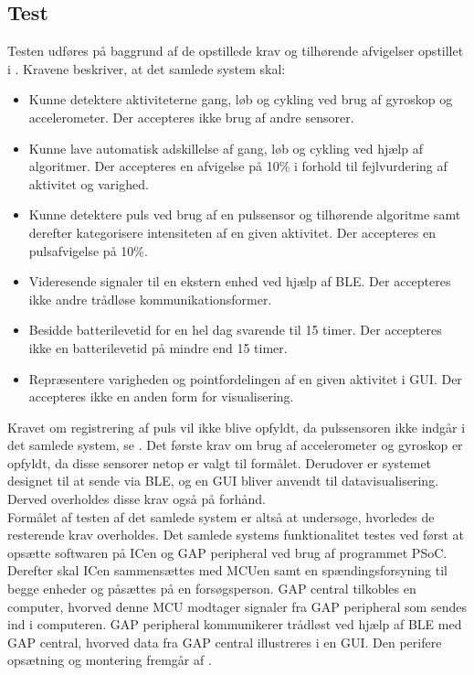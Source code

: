 \subsection{Test}
Testen udføres på baggrund af de opstillede krav og tilhørende afvigelser opstillet i . Kravene beskriver, at det samlede system skal:
\begin{itemize}
	\item Kunne detektere aktiviteterne gang, løb og cykling ved brug af gyroskop og accelerometer. Der accepteres ikke brug af andre sensorer.
	\item Kunne lave automatisk adskillelse af gang, løb og cykling ved hjælp af algoritmer. Der accepteres en afvigelse på 10\% i forhold til fejlvurdering af aktivitet og varighed.
	\item Kunne detektere puls ved brug af en pulssensor og tilhørende algoritme samt derefter kategorisere intensiteten af en given aktivitet. Der accepteres en pulsafvigelse på 10\%.
	\item Videresende signaler til en ekstern enhed ved hjælp af BLE. Der accepteres ikke andre trådløse kommunikationsformer.
	\item Besidde batterilevetid for en hel dag svarende til 15 timer. Der accepteres ikke en batterilevetid på mindre end 15 timer.
	\item Repræsentere varigheden og pointfordelingen af en given aktivitet i GUI. Der accepteres ikke en anden form for visualisering. 
\end{itemize}
Kravet om registrering af puls vil ikke blive opfyldt, da pulssensoren ikke indgår i det samlede system, se . Det første krav om brug af accelerometer og gyroskop er opfyldt, da disse sensorer netop er valgt til formålet. Derudover er systemet designet til at sende via BLE, og en GUI bliver anvendt til datavisualisering. Derved overholdes disse krav også på forhånd. \\
Formålet af testen af det samlede system er altså at undersøge, hvorledes de resterende krav overholdes. Det samlede systems funktionalitet testes ved først at opsætte softwaren på ICen og GAP peripheral ved brug af programmet PSoC. Derefter skal ICen sammensættes med MCUen samt en spændingsforsyning til begge enheder og påsættes på en forsøgsperson. GAP central tilkobles en computer, hvorved denne MCU modtager signaler fra GAP peripheral som sendes ind i computeren. GAP peripheral kommunikerer trådløst ved hjælp af BLE med GAP central, hvorved data fra GAP central illustreres i en GUI. Den perifere opsætning og montering fremgår af .
